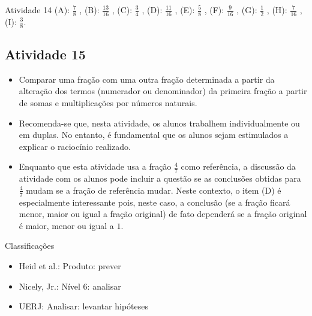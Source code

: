\begin{multicols}{2}
\begin{resposta*}{Atividade 14}
  (A):   $\frac{7}{8}$  ,  
  (B):   $\frac{13}{16}$  ,  
  (C):   $\frac{3}{4}$  ,   
  (D):   $\frac{11}{16}$  ,  
  (E):   $\frac{5}{8}$  ,  
  (F):   $\frac{9}{16}$  ,  
  (G):   $\frac{1}{2}$  ,  
  (H):   $\frac{7}{16}$  ,  
  (I):   $\frac{3}{8}$.  
\end{resposta*}



\subsection{Atividade 15}

\begin{itemize} %
    \item       Comparar uma fração com uma outra fração determinada a partir da 
alteração dos termos (numerador ou denominador) da primeira fração a partir de 
somas e multiplicações por números naturais.
\end{itemize} %
  
  
 
\begin{itemize} %
    \item       Recomenda-se que, nesta atividade, os alunos trabalhem 
individualmente ou em duplas. No entanto, é fundamental que os alunos sejam 
estimulados a explicar o raciocínio realizado.
    \item       Enquanto que esta atividade usa a fração       $\frac{4}{7}$     
  como referência, a discussão da atividade com os alunos pode incluir a questão 
se as conclusões obtidas para       $\frac{4}{7}$       mudam se a fração de 
referência mudar. Neste contexto, o item (D) é especialmente interessante pois, 
neste caso, a conclusão (se a fração ficará menor, maior ou igual a fração 
original) de fato dependerá se a fração original é maior, menor ou igual a       
$1$.
\end{itemize} %
  
  
  Classificações  
\begin{itemize} %
    \item       Heid et al.: Produto: prever
    \item       Nicely, Jr.: Nível 6: analisar
    \item       UERJ: Analisar: levantar hipóteses
\end{itemize} %


\end{multicols}
